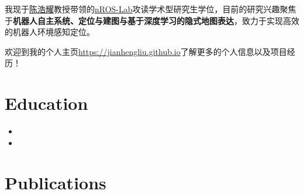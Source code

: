 \documentclass[11pt,a4paper,sans]{moderncv}        %
\begin{document}
\makecvtitle

\small{我现于\href{faculty.hitsz.edu.cn/chenhaoyao}{陈浩耀}教授带领的\href{http://nrs-lab.com/}{nROS-Lab}攻读学术型研究生学位，目前的研究兴趣聚焦于\textbf{机器人自主系统、定位与建图与基于深度学习的隐式地图表达}，致力于实现高效的机器人环境感知定位。

欢迎到我的个人主页\href{https://jianhengliu.github.io}{https://jianhengliu.github.io}了解更多的个人信息以及项目经历！
}

\section{Education}

\begin{itemize}

\item{}

\item{}

\end{itemize}

\vspace{2pt}

\section{Publications}
\end{document}
